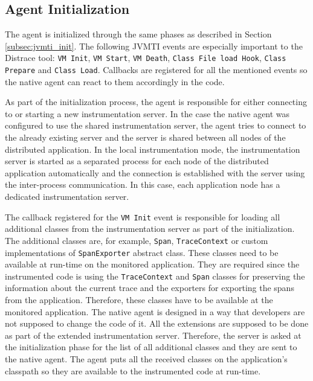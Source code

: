 \subsection{Agent Initialization}
\label{desing:native_initialization}
The agent is initialized through the same phases as described in Section \ref{subsec:jvmti_init}. The following JVMTI events are especially important to the Distrace tool: \texttt{VM Init}, \texttt{VM Start}, \texttt{VM Death}, \texttt{Class File load Hook}, \texttt{Class Prepare} and \texttt{Class Load}. Callbacks are registered for all the mentioned events so the native agent can react to them accordingly in the code.

As part of the initialization process, the agent is responsible for either connecting to or starting a new instrumentation server. In the case the native agent was configured to use the shared instrumentation server, the agent tries to connect to the already existing server and the server is shared between all nodes of the distributed application. In the local instrumentation mode, the instrumentation server is started as a separated process for each node of the distributed application automatically and the connection is established with the server using the inter-process communication. In this case, each application node has a dedicated instrumentation server.

The callback registered for the \texttt{VM Init} event is responsible for loading all additional classes from the instrumentation server as part of the initialization. The additional classes are, for example, \texttt{Span}, \texttt{TraceContext} or custom implementations of \texttt{SpanExporter} abstract class. These classes need to be available at run-time on the monitored application. They are required since the instrumented code is using the \texttt{TraceContext} and \texttt{Span} classes for preserving the information about the current trace and the exporters for exporting the spans from the application. Therefore, these classes have to be available at the monitored application. The native agent is designed in a way that developers are not supposed to change the code of it. All the extensions are supposed to be done as part of the extended instrumentation server. Therefore, the server is asked at the initialization phase for the list of all additional classes and they are sent to the native agent. The agent puts all the received classes on the application's classpath so they are available to the instrumented code at run-time.

